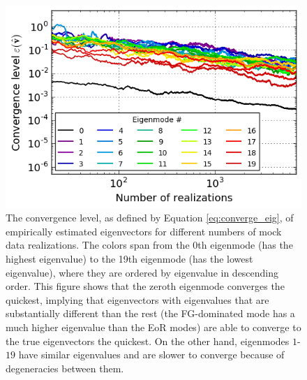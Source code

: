 \documentclass[preprint2,numberedappendix,tighten]{aastex6}  %
\begin{document}
\begin{figure}
	\centering
	\includegraphics[width=\columnwidth]{plots/toy_sigloss17.pdf}
	\caption{The convergence level, as defined by Equation \eqref{eq:converge_eig}, of empirically estimated eigenvectors for different numbers of mock data realizations. The colors span from the 0th eigenmode (has the highest eigenvalue) to the 19th eigenmode (has the lowest eigenvalue), where they are ordered by eigenvalue in descending order. This figure shows that the zeroth eigenmode converges the quickest, implying that eigenvectors with eigenvalues that are substantially different than the rest (the FG-dominated mode has a much higher eigenvalue than the EoR modes) are able to converge to the true eigenvectors the quickest. On the other hand, eigenmodes $1$-$19$ have similar eigenvalues and are slower to converge because of degeneracies between them.}
	\label{fig:toy_sigloss17}
\end{figure}
\end{document}
